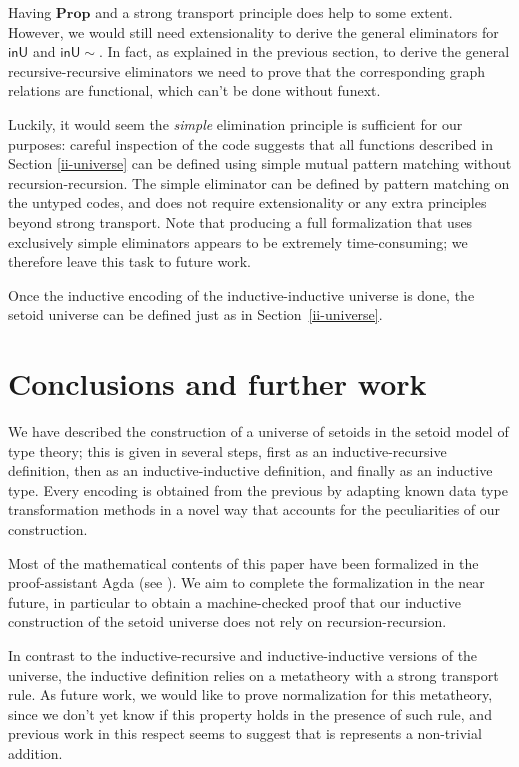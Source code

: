 \documentclass[a4paper,UKenglish,cleveref, autoref, thm-restate]{lipics-v2019}
\newcommand{\inU}{\mathsf{inU}}
\newcommand{\inUU}{\mathsf{inU{\sim}}}
\newcommand{\mProp}{\mathbf{Prop}}
\begin{document}
Having $\mProp$ and a strong transport principle does help to some extent.
%
However, we would still need extensionality to derive the general eliminators
for $\inU$ and $\inUU$. In fact, as explained in the previous section,
to derive the general recursive-recursive eliminators we need to prove that the
corresponding graph relations are functional, which can't be done without funext.

Luckily, it would seem the \emph{simple} elimination principle is sufficient for
our purposes: careful inspection of the code suggests that all functions
described in Section \ref{ii-universe} can be defined using simple mutual
pattern matching without recursion-recursion. The simple eliminator can be
defined by pattern matching on the untyped codes, and does not require
extensionality or any extra principles beyond strong transport. Note that
producing a full formalization that uses exclusively simple eliminators appears
to be extremely time-consuming; we therefore leave this task to future work.

Once the inductive encoding of the inductive-inductive universe is done, the
setoid universe can be defined just as in Section~\ref{ii-universe}.

\section{Conclusions and further work}\label{further-work}

We have described the construction of a universe of setoids in the setoid model
of type theory; this is given in several steps, first as an inductive-recursive
definition, then as an inductive-inductive definition, and finally as an
inductive type. Every encoding is obtained from the previous by adapting known
data type transformation methods in a novel way that accounts for the
peculiarities of our construction.

Most of the mathematical contents of this paper have been formalized in the
proof-assistant Agda (see \cite{agda-code}). We aim to complete the
formalization in the near future, in particular to obtain a machine-checked
proof that our inductive construction of the setoid universe does not rely on
recursion-recursion.

In contrast to the inductive-recursive and inductive-inductive
versions of the universe, the inductive definition relies on a
metatheory with a strong transport rule. As future work, we would like
to prove normalization for this metatheory, since we don't yet know if
this property holds in the presence of such rule, and previous work in
this respect \cite{abel2019failure} seems to suggest that is
represents a non-trivial addition.
\end{document}
